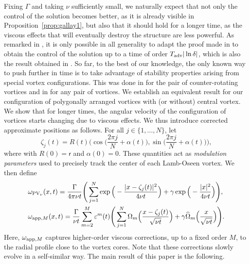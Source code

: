 \documentclass[11pt,reqno,a4paper]{amsart}
\def\eps{\varepsilon}
\newcommand{\1}{\mathbbm{1}}
\theoremstyle{definition}
\theoremstyle{definition}
\numberwithin{equation}{section}
\begin{document}
Fixing $\Gamma$ and taking $\nu$ sufficiently small, we naturally expect that not only the control of the solution becomes better, as it is already visible in Proposition~\ref{prop:gallay1}, but also that it should hold for a longer time, as the viscous effects that will eventually destroy the structure are less powerful. As remarked in \cite{donati2025fast}, it is only possible in all generality to adapt the proof made in \cite{Gallay2011} to obtain the control of the solution up to a time of order $T_{\rm adv} |\ln \delta|$, which is also the result obtained in \cite{CeSeis24}. So far, to the best of our knowledge, the only known way to push further in time is to take advantage of stability properties arising from special vortex configurations. This was done in \cite{dolce2024long} for the pair of counter-rotating vortices and in \cite{zhang2025long} for any pair of vortices. We establish an equivalent result for our configuration of polygonally arranged vortices with (or without) central vortex. We show that for longer times, the angular velocity of the configuration of vortices starts changing due to viscous effects. 
We thus introduce corrected approximate positions as follows.
For all $j \in \{1,\ldots,N\}$, let
\begin{equation}
    \zeta_j(t) = R(t)\Big(\cos\Big(\frac{2\pi j}{N}+\alpha(t)\Big) ,\sin\Big(\frac{2\pi j}{N}+\alpha(t) \Big) \Big),
\end{equation}
where with $R(0)=\mathsf{r}$ and $\alpha(0) = 0$. These quantities act as \emph{modulation parameters} used to precisely track the center of each Lamb-Oseen vortex. We then define
\begin{align}
    \label{eq:PVnu}&\omega_{\mathrm{PV}_\nu}(x,t) = \frac{\Gamma}{4\pi\nu t}\Bigg(\sum_{j=1}^N  \exp\Big(-\frac{|x-\zeta_j(t)|^2}{4\nu t}\Big) + \gamma \exp\Big(-\frac{|x|^2}{4\nu t}\Big)\Bigg), \\
    \label{eq:appM}&\omega_{{\rm app},M}(x,t)=\frac{\Gamma}{\nu t}\sum_{m=2}^M\eps^m(t)\Bigg(\sum_{j=1}^N  \Omega_{m}\Big(\frac{x-\zeta_j(t)}{\sqrt{\nu t}}\Big) + \gamma\widehat{\Omega}_{m}\Big(\frac{x}{\sqrt{\nu t}}\Big)\Bigg).
\end{align}
Here, $\omega_{{\rm app},M}$ captures higher-order viscous corrections, up to a fixed order $M$, to the radial profile close to the vortex cores. Note that these corrections slowly evolve in a self-similar way. The main result of this paper is the following.
\end{document}
